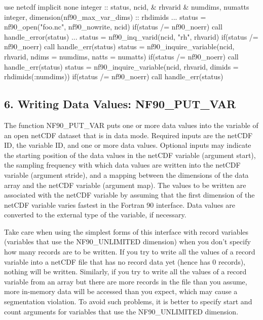 \begin{DoxyCode}
   \textcolor{keywordtype}{use }netcdf
   \textcolor{keywordtype}{implicit none}
   \textcolor{keywordtype}{integer}                            :: status, ncid, &
                                         rhvarid       &
                                         numdims, numatts
\textcolor{keywordtype}{integer}, \textcolor{keywordtype}{dimension(nf90\_max\_var\_dims)} :: rhdimids
...
status = nf90\_open(\textcolor{stringliteral}{"foo.nc"}, nf90\_nowrite, ncid)
\textcolor{keywordflow}{if}(status /= nf90\_noerr) \textcolor{keyword}{call }handle\_error(status)
...
status = nf90\_inq\_varid(ncid, \textcolor{stringliteral}{"rh"}, rhvarid)
\textcolor{keywordflow}{if}(status /= nf90\_noerr) \textcolor{keyword}{call }handle\_err(status)
status = nf90\_inquire\_variable(ncid, rhvarid, ndims = numdims, natts = numatts)
\textcolor{keywordflow}{if}(status /= nf90\_noerr) \textcolor{keyword}{call }handle\_err(status)
status = nf90\_inquire\_variable(ncid, rhvarid, dimids = rhdimids(:numdims))
\textcolor{keywordflow}{if}(status /= nf90\_noerr) \textcolor{keyword}{call }handle\_err(status)
\end{DoxyCode}
\hypertarget{f90-variables_f90-writing-data-values-nf90_put_var}{}\subsection{6. Writing Data Values\+: N\+F90\+\_\+\+P\+U\+T\+\_\+\+V\+A\+R }\label{f90-variables_f90-writing-data-values-nf90_put_var}
The function N\+F90\+\_\+\+P\+U\+T\+\_\+\+V\+AR puts one or more data values into the variable of an open net\+C\+DF dataset that is in data mode. Required inputs are the net\+C\+DF ID, the variable ID, and one or more data values. Optional inputs may indicate the starting position of the data values in the net\+C\+DF variable (argument start), the sampling frequency with which data values are written into the net\+C\+DF variable (argument stride), and a mapping between the dimensions of the data array and the net\+C\+DF variable (argument map). The values to be written are associated with the net\+C\+DF variable by assuming that the first dimension of the net\+C\+DF variable varies fastest in the Fortran 90 interface. Data values are converted to the external type of the variable, if necessary.

Take care when using the simplest forms of this interface with record variables (variables that use the N\+F90\+\_\+\+U\+N\+L\+I\+M\+I\+T\+ED dimension) when you don’t specify how many records are to be written. If you try to write all the values of a record variable into a net\+C\+DF file that has no record data yet (hence has 0 records), nothing will be written. Similarly, if you try to write all the values of a record variable from an array but there are more records in the file than you assume, more in-\/memory data will be accessed than you expect, which may cause a segmentation violation. To avoid such problems, it is better to specify start and count arguments for variables that use the N\+F90\+\_\+\+U\+N\+L\+I\+M\+I\+T\+ED dimension.

